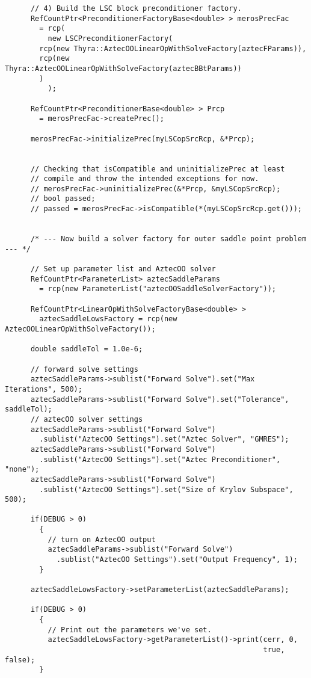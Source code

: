 \begin{verbatim}
      // 4) Build the LSC block preconditioner factory.
      RefCountPtr<PreconditionerFactoryBase<double> > merosPrecFac
        = rcp(
	      new LSCPreconditionerFactory(
		rcp(new Thyra::AztecOOLinearOpWithSolveFactory(aztecFParams)),
		rcp(new Thyra::AztecOOLinearOpWithSolveFactory(aztecBBtParams))
		)
	      );
      
      RefCountPtr<PreconditionerBase<double> > Prcp 
        = merosPrecFac->createPrec();
      
      merosPrecFac->initializePrec(myLSCopSrcRcp, &*Prcp);


      // Checking that isCompatible and uninitializePrec at least
      // compile and throw the intended exceptions for now.
      // merosPrecFac->uninitializePrec(&*Prcp, &myLSCopSrcRcp);
      // bool passed;
      // passed = merosPrecFac->isCompatible(*(myLSCopSrcRcp.get()));


      /* --- Now build a solver factory for outer saddle point problem --- */

      // Set up parameter list and AztecOO solver
      RefCountPtr<ParameterList> aztecSaddleParams 
        = rcp(new ParameterList("aztecOOSaddleSolverFactory"));
      
      RefCountPtr<LinearOpWithSolveFactoryBase<double> >
        aztecSaddleLowsFactory = rcp(new AztecOOLinearOpWithSolveFactory());
      
      double saddleTol = 1.0e-6;

      // forward solve settings
      aztecSaddleParams->sublist("Forward Solve").set("Max Iterations", 500);
      aztecSaddleParams->sublist("Forward Solve").set("Tolerance", saddleTol);
      // aztecOO solver settings
      aztecSaddleParams->sublist("Forward Solve")
        .sublist("AztecOO Settings").set("Aztec Solver", "GMRES");
      aztecSaddleParams->sublist("Forward Solve")
        .sublist("AztecOO Settings").set("Aztec Preconditioner", "none");
      aztecSaddleParams->sublist("Forward Solve")
        .sublist("AztecOO Settings").set("Size of Krylov Subspace", 500);

      if(DEBUG > 0)
        {
          // turn on AztecOO output
          aztecSaddleParams->sublist("Forward Solve")
            .sublist("AztecOO Settings").set("Output Frequency", 1);
        }

      aztecSaddleLowsFactory->setParameterList(aztecSaddleParams);

      if(DEBUG > 0)
        {
          // Print out the parameters we've set.
          aztecSaddleLowsFactory->getParameterList()->print(cerr, 0, 
                                                            true, false);
        }




\end{verbatim}

